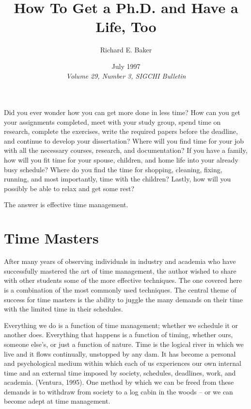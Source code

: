 \documentclass[twocolumn]{article}
\title{How To Get a Ph.D. and Have a Life, Too}
\author{Richard E. Baker}
\date{July 1997 \\\textit{Volume 29, Number 3, SIGCHI Bulletin}}
\begin{document}
\maketitle




\noindent
Did you ever wonder how you can get more done in less time? How can you get your
assignments completed, meet with your study group, spend time on research,
complete the exercises, write the required papers before the deadline, and
continue to develop your dissertation? Where will you find time for your job with
all the necessary courses, research, and documentation? If you have a family, how
will you fit time for your spouse, children, and home life into your already busy
schedule? Where do you find the time for shopping, cleaning, fixing, running, and
most importantly, time with the children? Lastly, how will you possibly be able
to relax and get some rest?

The answer is effective time management.

\section*{Time Masters}
\noindent
After many years of observing individuals in industry and academia who have
successfully mastered the art of time management, the author wished to share with
other students some of the more effective techniques. The one covered here is a
combination of the most commonly used techniques. The central theme of success for
time masters is the ability to juggle the many demands on their time with the
limited time in their schedules.

Everything we do is a function of time management; whether we schedule it or
another does. Everything that happens is a function of timing, whether ours,
someone else's, or just a function of nature. Time is the logical river in which
we live and it flows continually, unstopped by any dam. It has become a personal
and psychological medium within which each of us experiences our own internal
time and an external time imposed by society, schedules, deadlines, work, and
academia. (Ventura, 1995). One method by which we can be freed from these demands
is to withdraw from society to a log cabin in the woods – or we can become adept
at time management.
\end{document}
